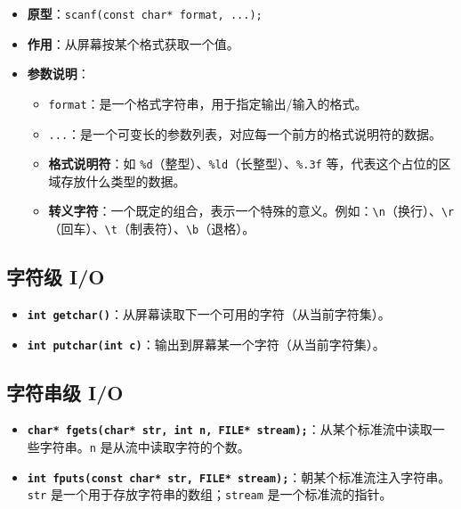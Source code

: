\begin{itemize}
    \item \textbf{原型}：\texttt{scanf(const char* format, ...);}
    \item \textbf{作用}：从屏幕按某个格式获取一个值。
    \item \textbf{参数说明}：
    \begin{itemize}
        \item \texttt{format}：是一个格式字符串，用于指定输出/输入的格式。
        \item \texttt{...}：是一个可变长的参数列表，对应每一个前方的格式说明符的数据。
        \item \textbf{格式说明符}：如 \texttt{\%d}（整型）、\texttt{\%ld}（长整型）、\texttt{\%.3f} 等，代表这个占位的区域存放什么类型的数据。
        \item \textbf{转义字符}：一个既定的组合，表示一个特殊的意义。例如：\texttt{\textbackslash n}（换行）、\texttt{\textbackslash r}（回车）、\texttt{\textbackslash t}（制表符）、\texttt{\textbackslash b}（退格）。
    \end{itemize}
\end{itemize}

\subsection{字符级 I/O}

\begin{itemize}
    \item \textbf{\texttt{int getchar()}}：从屏幕读取下一个可用的字符（从当前字符集）。
    \item \textbf{\texttt{int putchar(int c)}}：输出到屏幕某一个字符（从当前字符集）。
\end{itemize}

\subsection{字符串级 I/O}

\begin{itemize}
    \item \textbf{\texttt{char* fgets(char* str, int n, FILE* stream);}}：从某个标准流中读取一些字符串。\texttt{n} 是从流中读取字符的个数。
    \item \textbf{\texttt{int fputs(const char* str, FILE* stream);}}：朝某个标准流注入字符串。\texttt{str} 是一个用于存放字符串的数组；\texttt{stream} 是一个标准流的指针。
\end{itemize}

